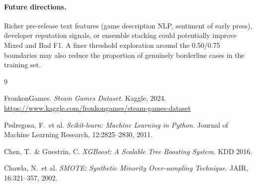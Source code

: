 \documentclass[11pt, a4paper]{article}
\begin{document}
\paragraph{Future directions.}
Richer pre-release text features (game description NLP, sentiment of early press),
developer reputation signals, or ensemble stacking could potentially improve Mixed
and Bad F1. A finer threshold exploration around the 0.50/0.75 boundaries may also
reduce the proportion of genuinely borderline cases in the training set.

\begin{thebibliography}{9}

  FronkonGames.
  \textit{Steam Games Dataset.}
  Kaggle, 2024.
  \url{https://www.kaggle.com/fronkongames/steam-games-dataset}

  Pedregosa, F.\ et al.
  \textit{Scikit-learn: Machine Learning in Python.}
  Journal of Machine Learning Research, 12:2825--2830, 2011.

  Chen, T.\ \& Guestrin, C.
  \textit{XGBoost: A Scalable Tree Boosting System.}
  KDD 2016.

  Chawla, N.\ et al.
  \textit{SMOTE: Synthetic Minority Over-sampling Technique.}
  JAIR, 16:321--357, 2002.

\end{thebibliography}
\end{document}
